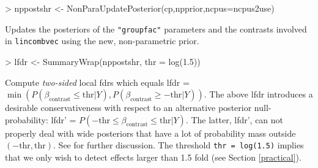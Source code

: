 \documentclass[11pt]{article}
\begin{document}
\begin{Schunk}
\begin{Sinput}
> nppostshr <- NonParaUpdatePosterior(cp,npprior,ncpus=ncpus2use)
\end{Sinput}
\end{Schunk}
Updates the posteriors of the {\tt "groupfac"} parameters and the contrasts involved in {\tt lincombvec}
using the new, non-parametric prior.


\begin{Schunk}
\begin{Sinput}
> lfdr <- SummaryWrap(nppostshr, thr = log(1.5))
\end{Sinput}
\end{Schunk}
Compute {\it two-sided} local fdrs
which equals lfdr = $\min(P(\beta_{\text{contrast}} \leq \text{thr}|Y), P(\beta_{\text{contrast}} \geq -\text{thr}|Y))$.
The above lfdr introduces a desirable conservativeness with respect to
an alternative posterior null-probability: lfdr' = $P(-\text{thr} \leq \beta_{\text{contrast}} \leq \text{thr}|Y)$. The latter, lfdr',
can not properly deal with wide posteriors that have a lot of probability mass outside $(-\text{thr},\text{thr})$.
See \cite{WielShrinkSeq} for further discussion. The threshold {\tt thr = log(1.5)} implies that we only wish to detect effects larger
than 1.5 fold (see Section \ref{practical}).
\end{document}
